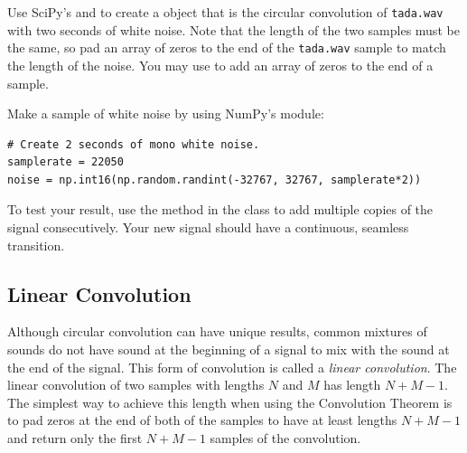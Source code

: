\begin{problem} %
Use SciPy's  and  to create a  object that is the circular convolution of \texttt{tada.wav} with two seconds of white noise.
Note that the length of the two samples must be the same, so pad an array of zeros to the end of the \texttt{tada.wav} sample to match the length of the noise. 
You may use  to add an array of zeros to the end of a sample. 

Make a sample of white noise by using NumPy's  module:
\begin{lstlisting}
# Create 2 seconds of mono white noise.
samplerate = 22050
noise = np.int16(np.random.randint(-32767, 32767, samplerate*2))
\end{lstlisting} 

To test your result, use the  method in the  class to add multiple copies of the signal consecutively. 
Your new signal should have a continuous, seamless transition. 
\end{problem}

\subsection*{Linear Convolution}
Although circular convolution can have unique results, common mixtures of sounds do not have sound at the beginning of a signal to mix with the sound at the end of the signal. 
This form of convolution is called a \emph{linear convolution}.
The linear convolution of two samples with lengths $N$ and $M$ has length $N+M-1$. 
The simplest way to achieve this length when using the Convolution Theorem is to pad zeros at the end of both of the samples to have at least lengths $N+M-1$ and return only the first $N+M-1$ samples of the convolution. 

